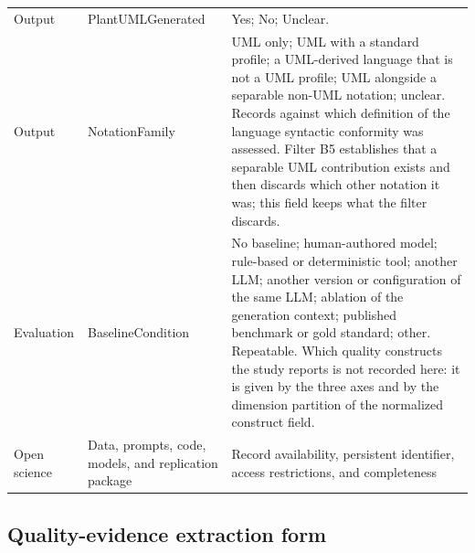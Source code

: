\begin{longtable}{p{} p{} p{}}
Output & PlantUMLGenerated & Yes; No; Unclear. \\
Output & NotationFamily & UML only; UML with a standard profile; a UML-derived language that is not a UML profile; UML alongside a separable non-UML notation; unclear. Records against which definition of the language syntactic conformity was assessed. Filter B5 establishes that a separable UML contribution exists and then discards which other notation it was; this field keeps what the filter discards. \\
Evaluation & BaselineCondition & No baseline; human-authored model; rule-based or deterministic tool; another LLM; another version or configuration of the same LLM; ablation of the generation context; published benchmark or gold standard; other. Repeatable. Which quality constructs the study reports is not recorded here: it is given by the three axes and by the dimension partition of the normalized construct field. \\
Open science & Data, prompts, code, models, and replication package & Record availability, persistent identifier, access restrictions, and completeness \\
\bottomrule
\end{longtable}

\subsection{Quality-evidence extraction form}

